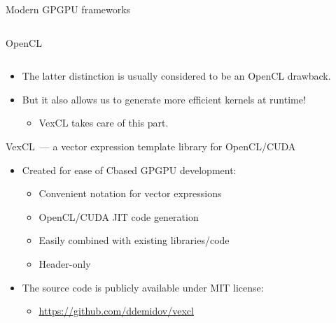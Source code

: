 \documentclass[@BEAMER_OPTIONS@]{beamer}
\newcommand{\CXX}{{\rm C}\plusplus}
\begin{document}
\begin{frame}{Modern GPGPU frameworks}
\begin{columns}
\begin{column}{0.45\textwidth}
\begin{block}{OpenCL}
            \end{block}
        \end{column}
    \end{columns}
    \vspace{\baselineskip}
    \pause
    \begin{itemize}
        \item The latter distinction is usually considered to be an OpenCL
            drawback.
        \item But it also allows us to generate more efficient kernels at
            runtime!
            \begin{itemize}
                \item VexCL takes care of this part.
            \end{itemize}
    \end{itemize}
\end{frame}


\begin{frame}{VexCL~--- a vector expression template library for OpenCL/CUDA}
    \begin{itemize}
        \item Created for ease of \CXX based GPGPU development:
            \begin{itemize}
                \item Convenient notation for vector expressions
                \item OpenCL/CUDA JIT code generation
                \item Easily combined with existing libraries/code
                \item Header-only
            \end{itemize}
            \vspace{\baselineskip}
        \item The source code is publicly available under MIT license:
            \begin{itemize}
                \item \href{https://github.com/ddemidov/vexcl}{https://github.com/ddemidov/vexcl}
            \end{itemize}
            \vspace{\baselineskip}
    \end{itemize}

\end{frame}
\end{document}

